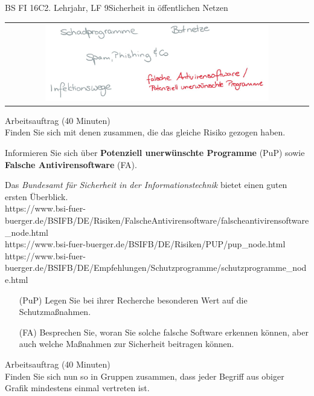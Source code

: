 \documentclass[oneside,openany,headings=optiontotoc,11pt,numbers=noenddot]{scrreprt}
\begin{document}
	\begin{worksheet}{BS FI 16C}{2. Lehrjahr, LF 9}{Sicherheit in öffentlichen Netzen}
		
		\begin{framed}
			\begin{tabular}{lcr}
				& \includegraphics[width=0.8\textwidth]{Bilder/AntivirUnwantedProg.jpg} & \\
			\end{tabular}
		\end{framed}
		\color{codegray}Arbeitsauftrag (40 Minuten)\\
		\color{black}
		Finden Sie sich mit denen zusammen, die das gleiche Risiko gezogen haben.
		\par
		\bigskip
		\noindent
		Informieren Sie sich über \textbf{Potenziell unerwünschte Programme} (PuP) sowie \textbf{Falsche Antivirensoftware} (FA).
		\par
		\bigskip
		\noindent
		Das \textit{Bundesamt für Sicherheit in der Informationstechnik} bietet einen guten ersten Überblick.\\
		\small{\color{codegray}https://www.bsi-fuer-buerger.de/BSIFB/DE/Risiken/FalscheAntivirensoftware/falscheantivirensoftware\_node.html\\
		https://www.bsi-fuer-buerger.de/BSIFB/DE/Risiken/PUP/pup\_node.html\\
		https://www.bsi-fuer-buerger.de/BSIFB/DE/Empfehlungen/Schutzprogramme/schutzprogramme\_node.html}
		\normalsize
		\begin{itemize}
			\item[(PuP)] Legen Sie bei ihrer Recherche besonderen Wert auf die Schutzmaßnahmen.
			\item[(FA)] Besprechen Sie, woran Sie solche falsche Software erkennen können, aber auch welche Maßnahmen zur Sicherheit beitragen können.
		\end{itemize}
		\par
		\bigskip
		\noindent
		
		\color{codegray}Arbeitsauftrag (40 Minuten)\\
		\color{black}
		Finden Sie sich nun so in Gruppen zusammen, dass jeder Begriff aus obiger Grafik mindestens einmal vertreten ist.
		

\end{worksheet}
\end{document}
